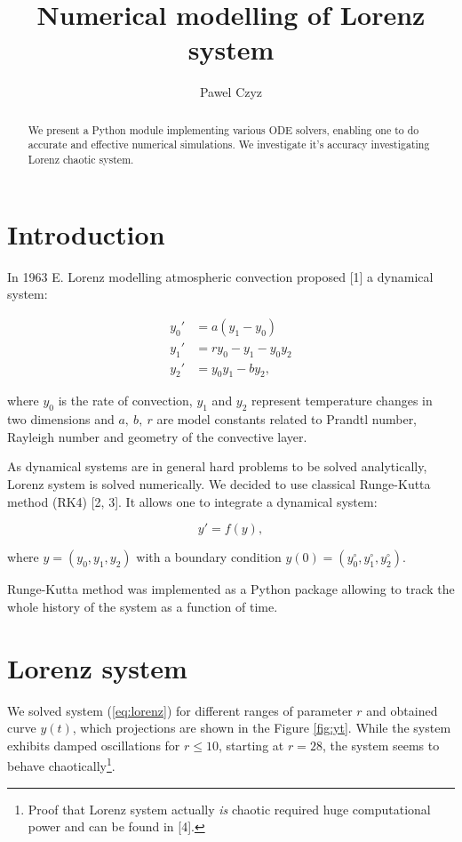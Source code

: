 \documentclass{llncs}
\begin{document}
\title{Numerical modelling of Lorenz system}
\author{Pawel Czyz}



\maketitle

\begin{abstract}
We present a Python module implementing various ODE solvers, enabling one to do accurate and effective numerical simulations. We investigate it's accuracy investigating Lorenz chaotic system.

\end{abstract}

\section{Introduction}
In 1963 E. Lorenz modelling atmospheric convection proposed [1] a dynamical system:

\begin{align}
\label{eq:lorenz}
  y_0'&=a(y_1-y_0)\\
  y_1'&=ry_0-y_1-y_0y_2\\
  y_2'&=y_0y_1-by_2,
\end{align}

where $y_0$ is the rate of convection, $y_1$ and $y_2$ represent temperature changes in two dimensions and  $a,~b,~r$ are model constants related to Prandtl number, Rayleigh number and geometry of the convective layer.

As dynamical systems are in general hard problems to be solved analytically, Lorenz system is solved numerically. We decided to use classical Runge-Kutta method (RK4) [2, 3]. It allows one to integrate a dynamical
system:

\begin{equation}
  y'=f(y),
\end{equation}

where $y=(y_0, y_1,y_2)$ with a boundary condition $y(0)=(y_0^\circ, y_1^\circ, y_2^\circ)$.

Runge-Kutta method was implemented as a Python package allowing to track the whole history of the system as a function of time.

\section{Lorenz system}
We solved system (\ref{eq:lorenz}) for different ranges of parameter $r$ and obtained curve $y(t)$, which projections are shown in the Figure \ref{fig:yt}. While the system exhibits damped oscillations for $r\le 10$, starting at $r=28$, the system seems to behave chaotically\footnote{Proof that Lorenz system actually \textit{is} chaotic required huge computational power and can be found in [4].}.
\end{document}
